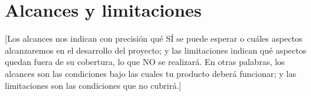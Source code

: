 \section{Alcances y limitaciones}

[Los alcances nos indican con precisión qué SÍ se puede esperar o cuáles aspectos alcanzaremos en el desarrollo del proyecto; y las limitaciones indican qué aspectos quedan fuera de su cobertura, lo que NO se realizará. 
En otras palabras, los alcances son las condiciones bajo las cuales tu producto deberá funcionar; y las limitaciones son las condiciones que no cubrirá.]

